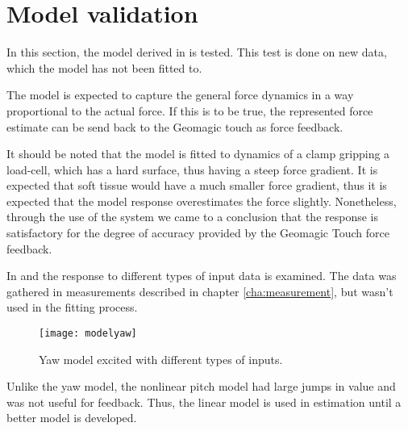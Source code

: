 {\section{Model validation} \label{se:mdval}
In this section, the model derived in  is tested. This test is done on new data, which the model has not been fitted to.



The model is expected to capture the general force dynamics in a way proportional to the actual force. If this is to be true, the represented force estimate can be send back to the Geomagic touch as force feedback.

It should be noted that the model is fitted to dynamics of a clamp gripping a load-cell, which has a hard surface, thus having a steep force gradient.
It is expected that soft tissue would have a much smaller force gradient, thus it is expected that the model response overestimates the force slightly.
Nonetheless, through the use of the system we came to a conclusion that the response is satisfactory for the degree of accuracy provided by the Geomagic Touch force feedback.

In  and  the response to different types of input data is examined.
The data was gathered in measurements described in chapter \ref{cha:measurement}, but wasn't used in the fitting process.


\begin{figure}[H]
\hspace{-3em}\texttt{[image: modelyaw]}
\caption{Yaw model excited with different types of inputs.}
\label{fig:final_res_yaw}
\end{figure}

Unlike the yaw model, the nonlinear pitch model had large jumps in value and was not useful for feedback.
Thus, the linear model is used in estimation until a better model is developed.

}

